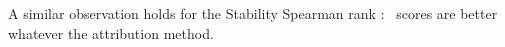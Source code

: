 



A similar observation 
holds for 
the Stability Spearman rank
: \otnn~scores are better whatever the attribution method.

